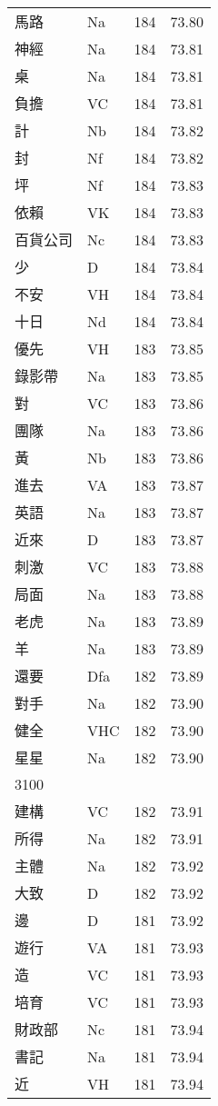 \documentclass[twocolumn]{book}
\begin{document}
\begin{supertabular}{llrr}
馬路 & Na & 184 &  73.80\\
神經 & Na & 184 &  73.81\\
桌 & Na & 184 &  73.81\\
負擔 & VC & 184 &  73.81\\
計 & Nb & 184 &  73.82\\
封 & Nf & 184 &  73.82\\
坪 & Nf & 184 &  73.83\\
依賴 & VK & 184 &  73.83\\
百貨公司 & Nc & 184 &  73.83\\
少 & D & 184 &  73.84\\
不安 & VH & 184 &  73.84\\
十日 & Nd & 184 &  73.84\\
優先 & VH & 183 &  73.85\\
錄影帶 & Na & 183 &  73.85\\
對 & VC & 183 &  73.86\\
團隊 & Na & 183 &  73.86\\
黃 & Nb & 183 &  73.86\\
進去 & VA & 183 &  73.87\\
英語 & Na & 183 &  73.87\\
近來 & D & 183 &  73.87\\
刺激 & VC & 183 &  73.88\\
局面 & Na & 183 &  73.88\\
老虎 & Na & 183 &  73.89\\
羊 & Na & 183 &  73.89\\
還要 & Dfa & 182 &  73.89\\
對手 & Na & 182 &  73.90\\
健全 & VHC & 182 &  73.90\\
星星 & Na & 182 &  73.90\\
3100\\
建構 & VC & 182 &  73.91\\
所得 & Na & 182 &  73.91\\
主體 & Na & 182 &  73.92\\
大致 & D & 182 &  73.92\\
邊 & D & 181 &  73.92\\
遊行 & VA & 181 &  73.93\\
造 & VC & 181 &  73.93\\
培育 & VC & 181 &  73.93\\
財政部 & Nc & 181 &  73.94\\
書記 & Na & 181 &  73.94\\
近 & VH & 181 &  73.94\\

\end{supertabular}
\end{document}

